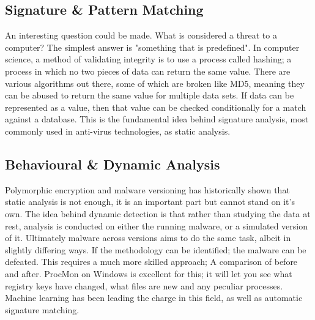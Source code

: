 \subsection{Signature \& Pattern Matching}
An interesting question could be made. What is considered a threat to a computer? The simplest answer is "something that is predefined". 
In computer science, a method of validating integrity is to use a process called hashing; a process in which no two pieces of data can return the same value. 
There are various algorithms out there, some of which are broken like MD5, meaning they can be abused to return the same value for multiple data sets. 
If data can be represented as a value, then that value can be checked conditionally for a match against a database. This is the fundamental idea behind signature analysis,
most commonly used in anti-virus technologies, as static analysis.


\subsection{Behavioural & Dynamic Analysis}
Polymorphic encryption and malware versioning has historically shown that static analysis is not enough, it is an important part but cannot stand on it's own. The idea behind dynamic detection is that rather than
studying the data at rest, analysis is conducted on either the running malware, or a simulated version of it. Ultimately malware across versions aims to do the same task, albeit in slightly differing ways. If the methodology
can be identified; the malware can be defeated. This requires a much more skilled approach; A comparison of before and after. ProcMon on Windows is excellent for this; it will let you see what registry keys have changed, what files are new and any peculiar processes.
Machine learning has been leading the charge in this field, as well as automatic signature matching.


